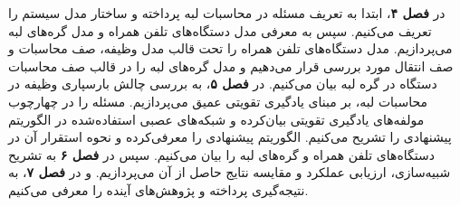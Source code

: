  در \textbf{فصل ۴}، ابتدا به تعریف مسئله در محاسبات لبه پرداخته و ساختار مدل سیستم را تعریف می‌کنیم.  سپس به معرفی مدل دستگاه‌های تلفن همراه و مدل گره‌های لبه می‌پردازیم. مدل دستگاه‌های تلفن همراه را تحت قالب مدل وظیفه، صف‌ محاسبات و صف انتقال مورد بررسی قرار می‌دهیم و مدل گره‌های لبه را در قالب صف محاسبات دستگاه در گره لبه بیان می‌کنیم.   
در \textbf{فصل ۵}، به بررسی چالش بارسپاری وظیفه در محاسبات لبه، بر مبنای یادگیری تقویتی عمیق می‌پردازیم. مسئله را در چهارچوب مولفه‌های یادگیری تقویتی بیان‌کرده و شبکه‌های عصبی استفاده‌شده در الگوریتم پیشنهادی را تشریح می‌کنیم. الگوریتم پیشنهادی را معرفی‌کرده و نحوه استقرار آن در دستگاه‌های تلفن همراه و گره‌های لبه را بیان می‌کنیم. سپس در \textbf{فصل ۶} به تشریح شبیه‌سازی، ارزیابی عملکرد و مقایسه نتایج حاصل از آن می‌پردازیم. و در \textbf{فصل ۷}، به نتیجه‌گیری پرداخته و پژوهش‌های آینده را معرفی می‌کنیم.





































